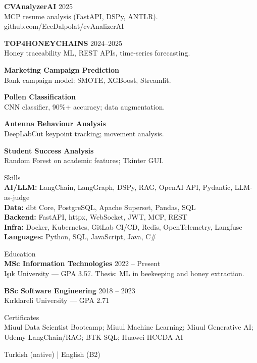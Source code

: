 \documentclass[11pt,a4paper]{article}
\newcommand{\cvsection}[1]{%
  \vspace{0.7em}%
  {\normalsize\fontseries{m}\selectfont #1}\\[0.25em]
}
\begin{document}
\vspace{0.25em}
\textbf{CVAnalyzerAI} \hfill 2025\\
MCP resume analysis (FastAPI, DSPy, ANTLR). github.com/EceDalpolat/cvAnalizerAI

\vspace{0.25em}
\textbf{TOP4HONEYCHAINS} \hfill 2024--2025\\
Honey traceability ML, REST APIs, time-series forecasting.

\vspace{0.25em}
\textbf{Marketing Campaign Prediction}\\
Bank campaign model: SMOTE, XGBoost, Streamlit.

\vspace{0.25em}
\textbf{Pollen Classification}\\
CNN classifier, 90\%+ accuracy; data augmentation.

\vspace{0.25em}
\textbf{Antenna Behaviour Analysis}\\
DeepLabCut keypoint tracking; movement analysis.

\vspace{0.25em}
\textbf{Student Success Analysis}\\
Random Forest on academic features; Tkinter GUI.

\cvsection{Skills}

\textbf{AI/LLM:} LangChain, LangGraph, DSPy, RAG, OpenAI API, Pydantic, LLM-as-judge\\
\textbf{Data:} dbt Core, PostgreSQL, Apache Superset, Pandas, SQL\\
\textbf{Backend:} FastAPI, httpx, WebSocket, JWT, MCP, REST\\
\textbf{Infra:} Docker, Kubernetes, GitLab CI/CD, Redis, OpenTelemetry, Langfuse\\
\textbf{Languages:} Python, SQL, JavaScript, Java, C\#

\cvsection{Education}

\textbf{MSc Information Technologies} \hfill 2022 -- Present\\
Işık University --- GPA 3.57. Thesis: ML in beekeeping and honey extraction.

\vspace{0.25em}
\textbf{BSc Software Engineering} \hfill 2018 -- 2023\\
Kırklareli University --- GPA 2.71

\cvsection{Certificates}

Miuul Data Scientist Bootcamp; Miuul Machine Learning; Miuul Generative AI; Udemy LangChain/RAG; BTK SQL; Huawei HCCDA-AI

\vspace{0.3em}
{\small Turkish (native) | English (B2)}
\end{document}
